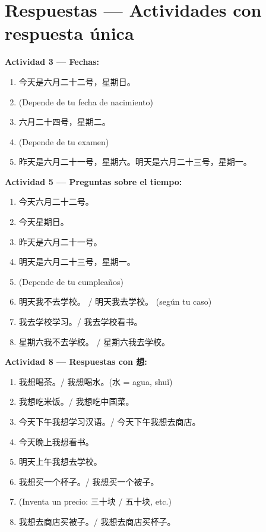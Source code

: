 \documentclass[12pt, a4paper]{article}
\begin{document}
\newpage
\section*{\textcolor{rojosuave}{Respuestas — Actividades con respuesta única}}

\textbf{Actividad 3 — Fechas:}
\begin{enumerate}[leftmargin=1.5cm]
\item 今天是六月二十二号，星期日。
\item (Depende de tu fecha de nacimiento)
\item 六月二十四号，星期二。
\item (Depende de tu examen)
\item 昨天是六月二十一号，星期六。\quad 明天是六月二十三号，星期一。
\end{enumerate}

\textbf{Actividad 5 — Preguntas sobre el tiempo:}
\begin{enumerate}[leftmargin=1.5cm]
\item 今天六月二十二号。
\item 今天星期日。
\item 昨天是六月二十一号。
\item 明天是六月二十三号，星期一。
\item (Depende de tu cumpleaños)
\item 明天我不去学校。 / 明天我去学校。 (según tu caso)
\item 我去学校学习。/ 我去学校看书。
\item 星期六我不去学校。 / 星期六我去学校。
\end{enumerate}

\textbf{Actividad 8 — Respuestas con 想:}
\begin{enumerate}[leftmargin=1.5cm]
\item 我想喝茶。/ 我想喝水。(水 = agua, shuǐ)
\item 我想吃米饭。/ 我想吃中国菜。
\item 今天下午我想学习汉语。/ 今天下午我想去商店。
\item 今天晚上我想看书。
\item 明天上午我想去学校。
\item 我想买一个杯子。/ 我想买一个被子。
\item (Inventa un precio: 三十块 / 五十块, etc.)
\item 我想去商店买被子。/ 我想去商店买杯子。
\end{enumerate}
\end{document}
